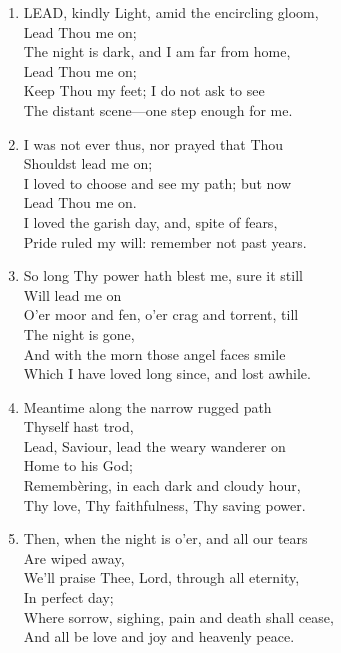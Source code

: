 \documentclass[11pt,a4paper]{article}
\begin{document}
\begin{enumerate}
    \item LEAD, kindly Light, amid the encircling gloom, \\
        Lead Thou me on; \\
        The night is dark, and I am far from home, \\
        Lead Thou me on; \\
        Keep Thou my feet; I do not ask to see \\
        The distant scene---one step enough for me.

    \item I was not ever thus, nor prayed that Thou \\
        Shouldst lead me on; \\
        I loved to choose and see my path; but now \\
        Lead Thou me on. \\
        I loved the garish day, and, spite of fears, \\
        Pride ruled my will: remember not past years.

    \item So long Thy power hath blest me, sure it still \\
        Will lead me on \\
        O'er moor and fen, o'er crag and torrent, till \\
        The night is gone, \\
        And with the morn those angel faces smile \\
        Which I have loved long since, and lost awhile.

    \item Meantime along the narrow rugged path \\
        Thyself hast trod, \\
        Lead, Saviour, lead the weary wanderer on \\
        Home to his God; \\
        Rememb\`ering, in each dark and cloudy hour, \\
        Thy love, Thy faithfulness, Thy saving power.

    \item Then, when the night is o'er, and all our tears \\
        Are wiped away, \\
        We'll praise Thee, Lord, through all eternity, \\
        In perfect day; \\
        Where sorrow, sighing, pain and death shall cease, \\
        And all be love and joy and heavenly peace.

\end{enumerate}
\end{document}
